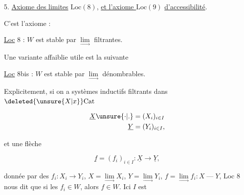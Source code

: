 
5. \uline{Axiome des limites} $\mathrm{Loc}(8)$, \uline{et l'axiome $\mathrm{Loc}$}$(9)$ \uline{d'accessibilité}.

C'est l'axiome :

\uline{Loc} 8 : $W$ est stable par $\underset{\longrightarrow}{\lim}$ filtrantes.

Une variante affaiblie utile est la suivante

\uline{Loc} 8bis : $W$ est stable par $\underset{\longrightarrow}{\lim}$ dénombrables.

Explicitement, si on a  systèmes inductifs filtrants dans $\deleted{\unsure{X|x}}\mathrm{Cat}$

\[
\begin{aligned}
\underline X\unsure{\cdot|.}&=(X_i)_{i\in I}\\
\underline Y&=(Y_i)_{i\in I},
\end{aligned}
\]

et une flèche

\[
\underline f=(f_i)_{i\in I}:\underline X\longrightarrow\underline Y,
\]

donnée par des $f_i:X_i\longrightarrow Y_i$,   $X=\underset{\longrightarrow}{\lim}X_i$, $Y=\underset{\longrightarrow}{\lim}Y_i$, $f=\underset{\longrightarrow}{\lim}f_i:X\mathbin{\text{---}}Y$, Loc 8 nous dit que si les $f_i\in W$, alors $f\in W$. Ici $I$ est

